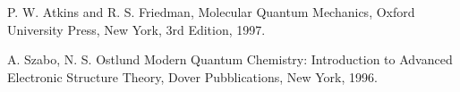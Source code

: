 \documentclass[a4paper,12pt]{article}
\begin{document}
\clearpage
{}
\begin{thebibliography}{9}


%
%

P. W. Atkins and R. S. Friedman,
Molecular Quantum Mechanics,
Oxford University Press, New York,
3rd Edition,
1997.

A. Szabo, N. S. Ostlund
Modern Quantum Chemistry: Introduction to Advanced Electronic Structure Theory,
Dover Pubblications, New York,
1996.
\end{thebibliography}
\end{document}
